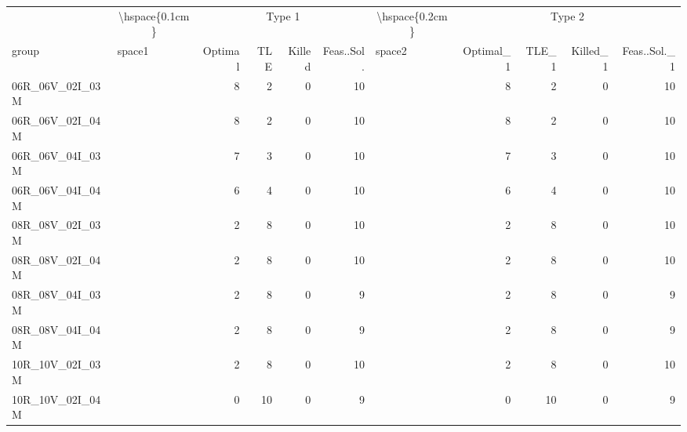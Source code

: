 
\begin{tabular}{llrrrrlrrrr}
\toprule
\multicolumn{1}{c}{} & \multicolumn{1}{c}{\textbackslash{}hspace\{0.1cm\}} & \multicolumn{4}{c}{Type 1} & \multicolumn{1}{c}{\textbackslash{}hspace\{0.2cm\}} & \multicolumn{4}{c}{Type 2} \\
\cmidrule(l{3pt}r{3pt}){2-2} \cmidrule(l{3pt}r{3pt}){3-6} \cmidrule(l{3pt}r{3pt}){7-7} \cmidrule(l{3pt}r{3pt}){8-11}
group & space1 & Optimal & TLE & Killed & Feas..Sol. & space2 & Optimal\_1 & TLE\_1 & Killed\_1 & Feas..Sol.\_1\\
\midrule
06R\_06V\_02I\_03M & \hspace{0.1cm} & 8 & 2 & 0 & 10 & \hspace{0.2cm} & 8 & 2 & 0 & 10\\
06R\_06V\_02I\_04M & \hspace{0.1cm} & 8 & 2 & 0 & 10 & \hspace{0.2cm} & 8 & 2 & 0 & 10\\
06R\_06V\_04I\_03M & \hspace{0.1cm} & 7 & 3 & 0 & 10 & \hspace{0.2cm} & 7 & 3 & 0 & 10\\
06R\_06V\_04I\_04M & \hspace{0.1cm} & 6 & 4 & 0 & 10 & \hspace{0.2cm} & 6 & 4 & 0 & 10\\
\addlinespace
08R\_08V\_02I\_03M & \hspace{0.1cm} & 2 & 8 & 0 & 10 & \hspace{0.2cm} & 2 & 8 & 0 & 10\\
08R\_08V\_02I\_04M & \hspace{0.1cm} & 2 & 8 & 0 & 10 & \hspace{0.2cm} & 2 & 8 & 0 & 10\\
08R\_08V\_04I\_03M & \hspace{0.1cm} & 2 & 8 & 0 & 9 & \hspace{0.2cm} & 2 & 8 & 0 & 9\\
08R\_08V\_04I\_04M & \hspace{0.1cm} & 2 & 8 & 0 & 9 & \hspace{0.2cm} & 2 & 8 & 0 & 9\\
\addlinespace
10R\_10V\_02I\_03M & \hspace{0.1cm} & 2 & 8 & 0 & 10 & \hspace{0.2cm} & 2 & 8 & 0 & 10\\
10R\_10V\_02I\_04M & \hspace{0.1cm} & 0 & 10 & 0 & 9 & \hspace{0.2cm} & 0 & 10 & 0 & 9\\

\end{tabular}
